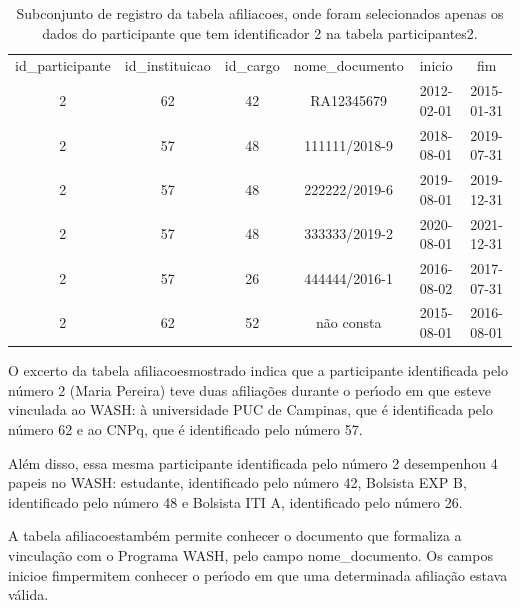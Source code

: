 \documentclass[
12pt,		%
openright,	%
twoside,  %
a4paper,			%
chapter=TITLE,		%
english,			%
french,				%
spanish,			%
brazil				%
]{USPSC-classe/USPSC}
\begin{document}
\begin{table}[htb]
\tiny
\caption{\label{e6120545268b93238330297571c4756e7c97df1a}Subconjunto de registro da tabela afiliacoes, onde foram selecionados apenas os dados do participante que tem identificador 2 na tabela participantes2.}

\centering
\begin{tabular}{|c|c|c|c|c|c|}
\hline
id\_participante  &  id\_instituicao  &  id\_cargo  &  nome\_documento  &  inicio      &  fim \\
              2  &              62  &        42  &  RA12345679      &  2012-02-01  &  2015-01-31  \\
              2  &              57  &        48  &  111111/2018-9   &  2018-08-01  &  2019-07-31  \\
              2  &              57  &        48  &  222222/2019-6   &  2019-08-01  &  2019-12-31  \\
              2  &              57  &        48  &  333333/2019-2   &  2020-08-01  &  2021-12-31  \\
              2  &              57  &        26  &  444444/2016-1   &  2016-08-02  &  2017-07-31  \\
              2  &              62  &        52  &  n\~ao consta      &  2015-08-01  &  2016-08-01 \\
\hline
\end{tabular}
\end{table}


O excerto da tabela \textquotedbl afiliacoes\textquotedbl  mostrado indica que a participante identificada pelo n\'umero 2 (Maria Pereira)  teve duas afilia\c{c}\~oes durante o per\'{\i}odo em que esteve vinculada ao WASH: \`a universidade PUC de Campinas, que \'e identificada pelo n\'umero 62 e ao CNPq, que \'e identificado pelo n\'umero 57.










Al\'em disso, essa mesma participante identificada pelo n\'umero 2 desempenhou 4 papeis no WASH: estudante, identificado pelo n\'umero 42, Bolsista EXP B, identificado pelo n\'umero 48 e Bolsista ITI A, identificado pelo n\'umero 26.










A tabela \textquotedbl afiliacoes\textquotedbl  tamb\'em permite conhecer o documento que formaliza a vincula\c{c}\~ao com o Programa WASH, pelo campo nome\_documento. Os campos \textquotedbl inicio\textquotedbl  e \textquotedbl fim\textquotedbl  permitem conhecer o per\'{\i}odo em que uma determinada afilia\c{c}\~ao estava v\'alida.
\end{document}
